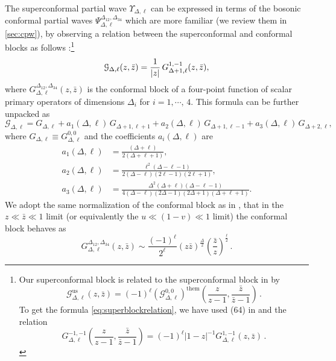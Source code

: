 \documentclass[11pt]{article}
\newcommand{\zb}{\bar{z}}
\begin{document}
The superconformal partial wave $\Upsilon_{\Delta,\ell}$ can be expressed in terms of the bosonic conformal partial waves $\Psi_{\Delta,\ell}^{\Delta_{12},\Delta_{34}}$ which are more familiar (we review them in \cref{sec:cpw}), by observing a relation between the superconformal and conformal blocks as follows \cite{Bobev:2015jxa}:\footnote{ Our superconformal block is related to the superconformal block in \cite{Bobev:2015jxa} by
\begin{equation}
\mathcal{G}^{\mathrm{us}}_{\Delta,\ell}(z,\zb)=(-1)^{\ell}(\mathcal{G}^{0,0}_{\Delta,\ell})^{\mathrm{them}}\left(\frac{z}{z-1},\frac{\zb}{\zb-1}\right)\,.
\end{equation}
To get the formula \eqref{eq:superblockrelation}, we have used (64) in \cite{Bobev:2015jxa} and the relation
\begin{equation}
G^{-1,-1}_{\Delta,\ell}\left(\frac{z}{ z-1}, \frac{\zb}{ \zb-1}\right)=(-1)^{\ell} |1-z|^{-1}G_{\Delta,\ell}^{1,-1}(z,\zb)\,.
\end{equation}
}
%
\begin{equation}\label{eq:superblockrelation}
\mathcal{G}_{\Delta,\ell}(z,\zb) = \frac{1}{\abs{z}}\, G_{\Delta+1,\ell}^{1,-1}(z,\zb),
\end{equation}
%
where $G^{\Delta_{12},\Delta_{34}}_{\Delta,\ell}(z,\zb)$ is the conformal block of a four-point function of scalar primary operators of dimensions $\Delta_i$ for $i=1,\cdots,\,4$. This formula can be further unpacked as 
%
\begin{equation}\label{eq:sconfdecomp}
\mathcal{G}_{\Delta,\ell} = 
  G_{\Delta,\ell}+a_{1}(\Delta,\ell)\, G_{\Delta+1,\ell+1}+a_{2}(\Delta,\ell)\, G_{\Delta+1,\ell-1}+a_{3}(\Delta,\ell)\, G_{\Delta+2,\ell},
\end{equation}
%
where $G_{\Delta,\ell}\equiv G^{0,0}_{\Delta,\ell}$ and the coefficients $a_i(\Delta,\ell)$ are
\begin{equation}\label{eq:sconfdecompcoeffs}
\begin{split}
a_{1}(\Delta,\ell) 
&= 
  \frac{(\Delta+\ell)}{2(\Delta+\ell+1)}, \\
a_{2}(\Delta,\ell) 
&=
   \frac{\ell^2(\Delta-\ell-1)}{2(\Delta-\ell)(2\ell-1)(2\ell+1)}, \\
a_{3}(\Delta,\ell) 
&= 
  \frac{\Delta^2(\Delta+\ell)(\Delta-\ell-1)}{4(\Delta-\ell)(2\Delta-1)(2\Delta+1)(\Delta+\ell+1)}.
\end{split}
\end{equation}
We adopt the same normalization of the conformal block as in \cite{Bobev:2015jxa}, that in the $z\ll \zb\ll 1$ limit (or equivalently the $u\ll(1-v)\ll 1$ limit) the conformal block behaves as
\begin{equation}
G^{\Delta_{12},\Delta_{34}}_{\Delta,\ell}(z,\zb)\sim \frac{(-1)^\ell}{2^\ell}(z\zb)^\frac{\Delta}{2}\left(\frac{\zb}{z}\right)^\frac{\ell}{2}\,.
\end{equation}
\end{document}
